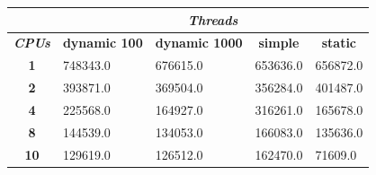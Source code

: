\documentclass[12pt,a4paper,oneside, titlepage]{report}
\begin{document}
		\begin{table}[H]
			\centering
			\begin{tabular}{c|l|l|l|l|}
				\cline{2-5}
				\multicolumn{1}{l|}{}                                     & \multicolumn{4}{c|}{\textit{\textbf{Threads}}}                                                                                                                                                                                                                         \\ \hline
				\multicolumn{1}{|c|}{\textit{\textbf{CPUs}}}              & \multicolumn{1}{c|}{\cellcolor[HTML]{EFEFEF}\textbf{dynamic 100}} & \multicolumn{1}{c|}{\cellcolor[HTML]{EFEFEF}\textbf{dynamic 1000}} & \multicolumn{1}{c|}{\cellcolor[HTML]{EFEFEF}\textbf{simple}} & \multicolumn{1}{c|}{\cellcolor[HTML]{EFEFEF}\textbf{static}} \\ \hline
				\multicolumn{1}{|c|}{\cellcolor[HTML]{EFEFEF}\textbf{1}}  & 748343.0                                                           & 676615.0                                                            & 653636.0                                                     & 656872.0                                                     \\ \hline
				\multicolumn{1}{|c|}{\cellcolor[HTML]{EFEFEF}\textbf{2}}  & 393871.0                                                           & 369504.0                                                            & 356284.0                                                     & 401487.0                                                     \\ \hline
				\multicolumn{1}{|c|}{\cellcolor[HTML]{EFEFEF}\textbf{4}}  & 225568.0                                                           & 164927.0                                                            & 316261.0                                                     & 165678.0                                                     \\ \hline
				\multicolumn{1}{|c|}{\cellcolor[HTML]{EFEFEF}\textbf{8}}  & 144539.0                                                           & 134053.0                                                            & 166083.0                                                     & 135636.0                                                     \\ \hline
				\multicolumn{1}{|c|}{\cellcolor[HTML]{EFEFEF}\textbf{10}} & 129619.0                                                           & 126512.0                                                            & 162470.0                                                     & 71609.0                                                      \\ \hline

\end{tabular}
\end{table}
\end{document}
